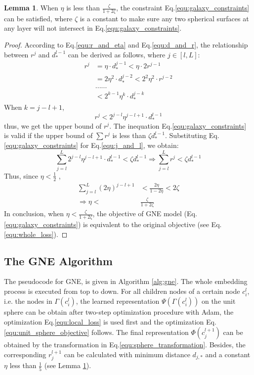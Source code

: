 \documentclass{article}
\theoremstyle{definition}
\newtheorem{lem}{Lemma}
\begin{document}
	 \begin{lem}
	 \label{prf:eta}
	 	When $\eta$ is less than $\frac{\zeta}{1+2\zeta}$, the constraint Eq.\ref{equ:galaxy_constraints} can be satisfied, where $\zeta$ is a constant to make sure any two spherical surfaces at any layer will not intersect in Eq.\ref{equ:galaxy_constraints}. 
	 \end{lem}
	 \begin{proof} 
	 	According to Eq.\ref{equ:r_and_eta} and Eq.\ref{equ:d_and_r}, the relationship between $r^j$ and $d_*^{l-1}$ can be derived as follows, where $j \in [l, L]$:	
	 	\begin{align}
	 	\label{equ:derivation}
	 		\nonumber
	 		r^j &= \eta \cdot d_*^{j-1} < \eta \cdot 2r^{j-1} \\
	 		\nonumber
	 		&= 2\eta^2 \cdot d_*^{j-2} < 2^2\eta^2 \cdot r^{j-2} \\
	 		\nonumber
	 		&... ...\\
	 		&< 2^{k-1}\eta^k \cdot d_*^{j-k}
	 	\end{align}
	 	When $k=j-l+1$, 
	 	\begin{equation}
	 		\label{equ:j_and_l}
	 		r^j < 2^{j-l}\eta^{j-l+1} \cdot d_*^{l-1}
	 	\end{equation}
	 	thus, we get the upper bound of $r^j$. The inequation Eq.\ref{equ:galaxy_constraints} is valid if the upper bound of $\sum r^j$ is less than $\zeta d_*^{l-1}$. Substituting Eq.\ref{equ:galaxy_constraints} for Eq.\ref{equ:j_and_l}, we obtain:
	 	\begin{equation}
	 	\nonumber
	 	\sum_{j=l}^L 2^{j-l} \eta^{j-l+1} \cdot d_*^{l-1} < \zeta d_*^{l-1} \Rightarrow \sum_{j=l}^L r^j < \zeta d_*^{l-1} 
	 	\end{equation}
	 	Thus, since $\eta < \frac{1}{2}$ , 
	 	\begin{align}
	 	\nonumber
	 	\sum_{j=l}^L (2\eta)^{j-l+1}& < \frac{2\eta}{1-2\eta}< 2 \zeta \\
	 	\nonumber
	 	\Rightarrow \eta <& \frac{\zeta}{1+2\zeta}
	 	\end{align}
	 	In conclusion, when $\eta < \frac{\zeta}{1+2\zeta}$, the objective of GNE model (Eq.\ref{equ:galaxy_constraints}) is equivalent to the original objective (see Eq.\ref{equ:whole_loss}).
	 \end{proof}

    \subsection{The GNE Algorithm}
	The pseudocode for GNE, is given in Algorithm \ref{alg:gne}. The whole embedding process is executed from top to down. For all children nodes of a certain node $c_i^l$, i.e. the nodes in $\Gamma(c_i^{l})$, the learned representation $\Psi(\Gamma(c_i^{l}))$ on the unit sphere can be obtain after two-step optimization procedure with Adam\cite{Rushing2005ADaM}, the optimization Eq.\ref{equ:local_loss} is used first and the optimization Eq.\ref{equ:unit_sphere_objective} follows.
    The final representation $\Phi(c_j^{l+1})$ can be obtained by the transformation in Eq.\ref{equ:sphere_transformation}. Besides, the corresponding $r_j^{l+1}$ can be calculated with minimum distance $d_{j,*}$ and a constant $\eta$ less than $\frac{1}{5}$ (see Lemma \ref{prf:eta}).
    
\end{document}
